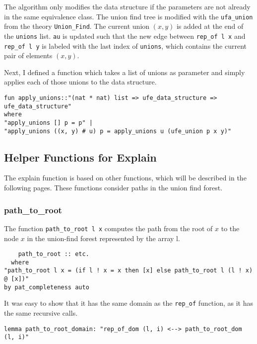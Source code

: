 The algorithm only modifies the data structure if the parameters are not already in the same equivalence class.
The union find tree is modified with the \lstinline{ufa_union} from the theory \lstinline{Union_Find}\cite{Sep}.
The current union $(x, y)$ is added at the end of the \lstinline{unions} list.
\lstinline{au} is updated such that the new edge between \lstinline{rep_of l x} and \lstinline{rep_of l y} is labeled with the last index of \lstinline{unions}, which contains the current pair of elements $(x, y)$. 

Next, I defined a function which takes a list of unions as parameter and simply applies each of those unions to the data structure. 

\begin{lstlisting}
fun apply_unions::"(nat * nat) list => ufe_data_structure => ufe_data_structure"
where
"apply_unions [] p = p" |
"apply_unions ((x, y) # u) p = apply_unions u (ufe_union p x y)"
\end{lstlisting}

\subsection{Helper Functions for Explain}

The explain function is based on other functions, which will be described in the following pages. These functions consider paths in the union find forest.

\subsubsection{path\_to\_root}

The function \lstinline{path_to_root l x} computes the path from the root of $x$ to the node $x$ in the union-find forest represented by the array l.

\begin{lstlisting}
	path_to_root :: etc.
  where 
"path_to_root l x = (if l ! x = x then [x] else path_to_root l (l ! x) @ [x])"
by pat_completeness auto
\end{lstlisting}

It was easy to show that it has the same domain as the \lstinline{rep_of} function, as it has the same recursive calls.

\begin{lstlisting}
lemma path_to_root_domain: "rep_of_dom (l, i) <--> path_to_root_dom (l, i)" 
\end{lstlisting}

